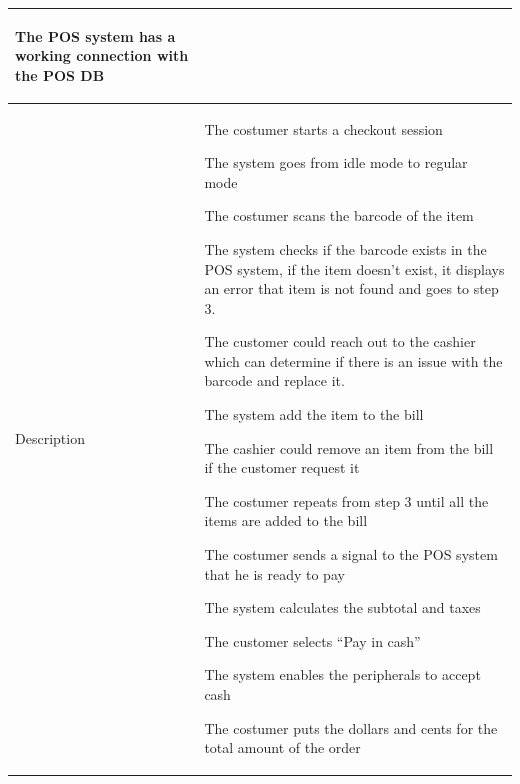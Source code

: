 \documentclass[12pt]{article}
\newenvironment{packed_enum}{
\begin{enumerate}[leftmargin=15pt, itemsep=0pt, parsep=0pt, font=\small]
  \setlength{\itemsep}{0pt}
  \setlength{\parskip}{0pt}
  \setlength{\parsep}{0pt}
}{\end{enumerate}}
\newenvironment{packed_enum_alpha}{
\begin{enumerate}[leftmargin=15pt, label=\alph*., font=\small]
  \setlength{\itemsep}{0pt}
  \setlength{\parskip}{0pt}
  \setlength{\parsep}{0pt}
}{\end{enumerate}}
\newenvironment{packed_item}{
\begin{itemize}
  \setlength{\itemsep}{0.1pt}
  \setlength{\parskip}{0pt}
  \setlength{\parsep}{0pt}
}{\end{itemize}}
\begin{document}
\begin{longtable}{| p{} | p{} |}
\begin{packed_item}
{            \item The POS system has a working connection with the POS DB
        }
    \end{packed_item} \\ 
    \hline
     Description & \begin{packed_enum}
        \begin{footnotesize}
            \item The costumer starts a checkout session 
            \item The system goes from idle mode to regular mode
            \item The costumer scans the barcode of the item
            \item The system checks if the barcode exists in the POS system, 
            if the item doesn’t exist, it displays an error that 
            item is not found and goes to step 3.
            \begin{packed_enum_alpha}
                \item The customer could reach out to the cashier which can 
                determine if there is an issue with the barcode and replace it.
            \end{packed_enum_alpha}
            \item The system add the item to the bill
            \begin{packed_enum_alpha}
                \item The cashier could remove an item from the bill if the 
                customer request it
            \end{packed_enum_alpha}
            \item The costumer repeats from step 3 until all the items 
            are added to the bill
            \item The costumer sends a signal to the POS system that 
            he is ready to pay
            \begin{packed_enum_alpha}
                \item The system calculates the subtotal and taxes
                \item The customer selects “Pay in cash”
                \begin{packed_enum}
                    \item The system enables the peripherals to accept cash
                    \item The costumer puts the dollars and cents for the total 
                    amount of the order

\end{packed_enum}
\end{packed_enum_alpha}
\end{footnotesize}
\end{packed_enum}
\end{longtable}
\end{document}
